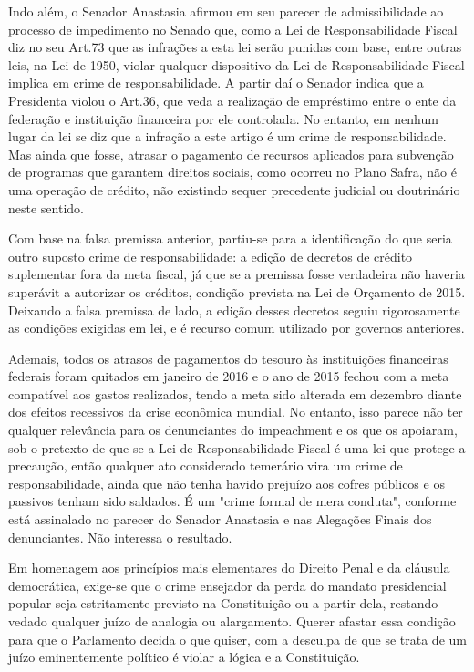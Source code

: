 Indo além, o Senador Anastasia afirmou em seu parecer de admissibilidade
ao processo de impedimento no Senado que, como a Lei de Responsabilidade
Fiscal diz no seu Art.73 que as infrações a esta lei serão punidas com
base, entre outras leis, na Lei de 1950, violar qualquer dispositivo da
Lei de Responsabilidade Fiscal implica em crime de responsabilidade. A
partir daí o Senador indica que a Presidenta violou o Art.36, que veda a
realização de empréstimo entre o ente da federação e instituição
financeira por ele controlada. No entanto, em nenhum lugar da lei se diz
que a infração a este artigo é um crime de responsabilidade. Mas ainda
que fosse, atrasar o pagamento de recursos aplicados para subvenção de
programas que garantem direitos sociais, como ocorreu no Plano Safra,
não é uma operação de crédito, não existindo sequer precedente judicial
ou doutrinário neste sentido.

Com base na falsa premissa anterior, partiu-se para a identificação do
que seria outro suposto crime de responsabilidade: a edição de decretos
de crédito suplementar fora da meta fiscal, já que se a premissa fosse
verdadeira não haveria superávit a autorizar os créditos, condição
prevista na Lei de Orçamento de 2015. Deixando a falsa premissa de lado,
a edição desses decretos seguiu rigorosamente as condições exigidas em
lei, e é recurso comum utilizado por governos anteriores.

Ademais, todos os atrasos de pagamentos do tesouro às instituições
financeiras federais foram quitados em janeiro de 2016 e o ano de 2015
fechou com a meta compatível aos gastos realizados, tendo a meta sido
alterada em dezembro diante dos efeitos recessivos da crise econômica
mundial. No entanto, isso parece não ter qualquer relevância para os
denunciantes do impeachment e os que os apoiaram, sob o pretexto de que
se a Lei de Responsabilidade Fiscal é uma lei que protege a precaução,
então qualquer ato considerado temerário vira um crime de
responsabilidade, ainda que não tenha havido prejuízo aos cofres
públicos e os passivos tenham sido saldados. É um "crime formal de mera
conduta", conforme está assinalado no parecer do Senador Anastasia e nas
Alegações Finais dos denunciantes. Não interessa o resultado.

Em homenagem aos princípios mais elementares do Direito Penal e da
cláusula democrática, exige-se que o crime ensejador da perda do mandato
presidencial popular seja estritamente previsto na Constituição ou a
partir dela, restando vedado qualquer juízo de analogia ou alargamento.
Querer afastar essa condição para que o Parlamento decida o que quiser,
com a desculpa de que se trata de um juízo eminentemente político é
violar a lógica e a Constituição.

